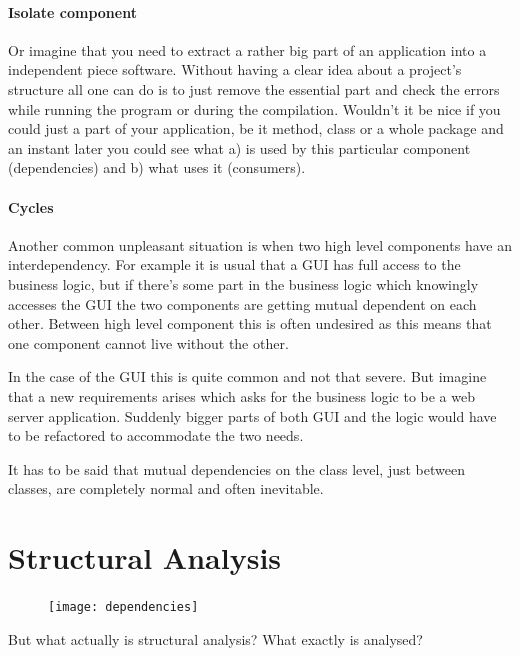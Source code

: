 \documentclass[12pt,halfparskip,DIV11,BCOR10mm]{scrreprt}
\begin{document}
\paragraph{Isolate component}
Or imagine that you need to extract a rather big part of an application into a independent piece software. Without having a clear idea about a project's structure all one can do is to just remove the essential part and check the errors while running the program or during the compilation. Wouldn't it be nice if you could just a part of your application, be it method, class or a whole package and an instant later you could see what a) is used by this particular component (dependencies) and b) what uses it (consumers).

\paragraph{Cycles} Another common unpleasant situation is when two high level components have an interdependency. For example it is usual that a GUI has full access to the business logic, but if there's some part in the business logic which knowingly accesses the GUI the two components are getting mutual dependent on each other. Between high level component this is often undesired as this means that one component cannot live without the other. 

In the case of the GUI this is quite common and not that severe. But imagine that a new requirements arises which asks for the business logic to be a web server application. Suddenly bigger parts of both GUI and the logic would have to be refactored to accommodate the two needs. 

It has to be said that mutual dependencies on the class level, just between classes, are completely normal and often inevitable. 

\section{Structural Analysis}


\begin{figure}
    \vspace{-0.6cm}
    \texttt{[image: dependencies]}
\end{figure}

But what actually is structural analysis? What exactly is analysed? 
\end{document}
